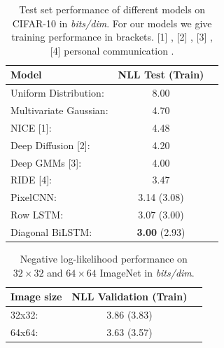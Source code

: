 \begin{table}[!h]
\centering
	\begin{tabular}{lcc}
		\toprule
		\textbf{Model} & \textbf{NLL Test (Train)}  \\ 
		\midrule
		Uniform Distribution: & 8.00 \\ 
		Multivariate Gaussian: & 4.70 \\ 
		NICE [1]: & 4.48 \\ 
		Deep Diffusion [2]: & 4.20 \\ 
		Deep GMMs [3]: & 4.00 \\
		RIDE [4]: & 3.47 \\ 
		\midrule
		PixelCNN: & 3.14 (3.08) \\ 
		Row LSTM: & 3.07 (3.00) \\ 
		Diagonal BiLSTM: \quad\quad\quad\quad\quad\quad\quad & \textbf{3.00} (2.93) \\ 
	    \bottomrule
	\end{tabular}
\caption{Test set performance of different models on CIFAR-10 in \emph{bits/dim}. For our models we give training performance in brackets. [1] \cite{dinh2014nice}, [2] \cite{deepdiffusion}, [3] \cite{van2014factoring}, [4] personal communication \cite{theis2015generative}.}
\label{table:cifar10}
\end{table}

\begin{table}[!h]
	\begin{center}
	\begin{tabular}{lcc}
		\toprule
		\textbf{Image size} & \textbf{NLL Validation (Train)}  \\ 
		\midrule
		32x32: & 3.86 (3.83) \\ 
		64x64: & 3.63 (3.57) \\ 
	    \bottomrule
	\end{tabular}
	\end{center}
\vspace{-0.2cm}
\caption{Negative log-likelihood performance on $32\times32$ and $64\times64$ ImageNet in \emph{bits/dim}.}
\label{table:imagenet}
\vspace{-0.4cm}
\end{table}


